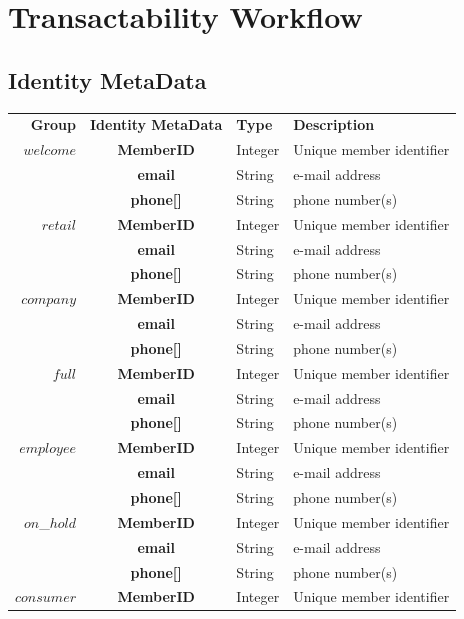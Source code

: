 \section{Transactability Workflow}

\subsection{Identity MetaData}

\begin{table}[H]
\begin{centering}
\small
{
\begin{tabular}{ r | c | l | l }
\textbf{Group}	& {\bf Identity MetaData} & {\bf Type} & {\bf Description} \\
\Xhline{1.5pt}
$welcome$	& {\bf MemberID}			&Integer	& Unique member identifier \\
			& {\bf email}				&String	& e-mail address \\		
			& {\bf phone[]}				&String	& phone number(s) \\
\hline
$retail$		& {\bf MemberID}			&Integer	& Unique member identifier \\
			& {\bf email}				&String	& e-mail address \\
			& {\bf phone[]}				&String	& phone number(s) \\
\hline
$company$	& {\bf MemberID}			&Integer	& Unique member identifier \\
			& {\bf email}				&String	& e-mail address \\
			& {\bf phone[]}				&String	& phone number(s) \\
\hline
$full$		& {\bf MemberID}			&Integer	& Unique member identifier \\
			& {\bf email}				&String	& e-mail address \\
			& {\bf phone[]}				&String	& phone number(s) \\
\hline
$employee$	& {\bf MemberID}			&Integer	& Unique member identifier \\
			& {\bf email}				&String	& e-mail address \\
			& {\bf phone[]}				&String	& phone number(s) \\
\hline
$on$\_$hold$	& {\bf MemberID}			&Integer	& Unique member identifier \\
			& {\bf email}				&String	& e-mail address \\
			& {\bf phone[]}				&String	& phone number(s) \\
\hline
$consumer$	& {\bf MemberID}	&Integer & Unique member identifier \\

\end{tabular}}
\end{centering}
\end{table}
